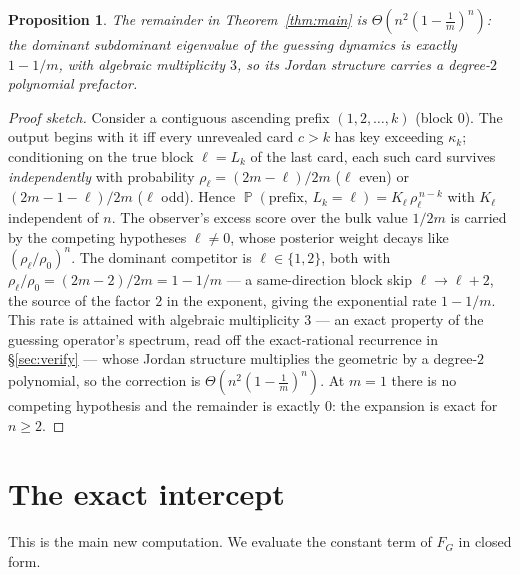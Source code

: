 \documentclass[11pt]{article}
\newtheorem{proposition}[theorem]{Proposition}
\theoremstyle{definition}
\DeclareMathOperator{\PP}{\mathbb{P}}
\newcommand{\Fg}{F_G}
\begin{document}
\begin{proposition}\label{prop:fade}
The remainder in Theorem~\ref{thm:main} is $\Theta\!\left(n^2(1-\tfrac1m)^n\right)$: the
dominant subdominant eigenvalue of the guessing dynamics is exactly $1-1/m$, with algebraic
multiplicity $3$, so its Jordan structure carries a degree-$2$ polynomial prefactor.
\end{proposition}

\begin{proof}[Proof sketch]
Consider a contiguous ascending prefix $(1,2,\dots,k)$ (block $0$). The output begins with it
iff every unrevealed card $c>k$ has key exceeding $\kappa_k$; conditioning on the true block
$\ell=L_k$ of the last card, each such card survives \emph{independently} with probability
$\rho_\ell=(2m-\ell)/2m$ ($\ell$ even) or $(2m-1-\ell)/2m$ ($\ell$ odd). Hence
$\PP(\text{prefix},\,L_k=\ell)=K_\ell\,\rho_\ell^{\,n-k}$ with $K_\ell$ independent of $n$. The
observer's excess score over the bulk value $1/2m$ is carried by the competing hypotheses
$\ell\neq0$, whose posterior weight decays like $(\rho_\ell/\rho_0)^n$. The dominant competitor
is $\ell\in\{1,2\}$, both with $\rho_\ell/\rho_0=(2m-2)/2m=1-1/m$ --- a same-direction block
skip $\ell\to\ell+2$, the source of the factor $2$ in the exponent, giving the exponential
rate $1-1/m$. This rate is attained with algebraic multiplicity $3$ --- an exact property of
the guessing operator's spectrum, read off the exact-rational recurrence in
\S\ref{sec:verify} --- whose Jordan structure multiplies the geometric by a degree-$2$
polynomial, so the correction is $\Theta(n^2(1-\tfrac1m)^n)$. At $m=1$ there is no competing
hypothesis and the remainder is exactly $0$: the expansion is exact for $n\ge2$.
\end{proof}

\section{The exact intercept}\label{sec:intercept}

This is the main new computation. We evaluate the constant term of $\Fg$ in closed form.
\end{document}
